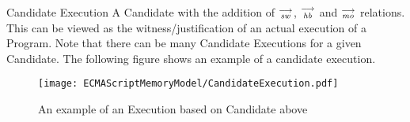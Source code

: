     \begin{definition}{Candidate Execution}
        A Candidate with the addition of $\stackrel{\longrightarrow}{_\textit{sw}}$, $\stackrel{\longrightarrow}{_\textit{hb}}$ and $\stackrel{\longrightarrow}{_\textit{mo}}$ relations. This can be viewed as the witness/justification of an actual execution of a Program. Note that there can be many Candidate Executions for a given Candidate. The following figure shows an example of a candidate execution. 
        
        \begin{figure}[H]
            \centering
            \texttt{[image: ECMAScriptMemoryModel/CandidateExecution.pdf]}
            \caption{An example of an Execution based on Candidate above}
            \label{fig:my_label}
        \end{figure}
        
    \end{definition}
    
    
